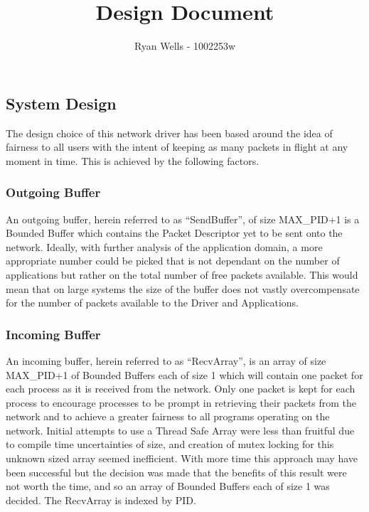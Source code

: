\documentclass{article}
\title{Design Document}
\author{Ryan Wells - 1002253w}
\begin{document}
\pagestyle{empty}
\maketitle
\subsection*{System Design}
The design choice of this network driver has been based around the
idea of fairness to all users with the intent of keeping as many
packets in flight at any moment in time. This is achieved by the
following factors.
\subsubsection*{Outgoing Buffer}
An outgoing buffer, herein referred to as ``SendBuffer'', of size
MAX\_PID+1 is a Bounded Buffer which contains the Packet Descriptor
yet to be sent onto
the network. Ideally, with further analysis of the application
domain, a more appropriate number could be picked that is not
dependant on the number of applications but rather on the total number
of free packets available. This would mean that on large systems the size
of the buffer does not vastly overcompensate for the number of
packets available to the Driver and Applications. 
\subsubsection*{Incoming Buffer}
An incoming buffer, herein referred to as ``RecvArray'', is an array
of size MAX\_PID+1 of Bounded Buffers each of size 1 which will
contain one packet for each process as it is received from the
network. Only one packet is kept for each process to encourage
processes to be prompt in retrieving their packets from the network
and to achieve a greater fairness to all programs operating on the
network. Initial attempts to use a Thread Safe Array were less than
fruitful due to compile time uncertainties of size, and creation of
mutex locking for this unknown sized array seemed inefficient. With
more time this approach may have been successful but the decision was
made that the benefits of this result were not worth the time, and so
an array of Bounded Buffers each of size 1 was decided. The RecvArray
is indexed by PID.
\end{document}
